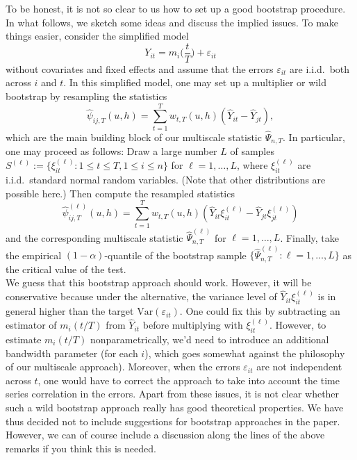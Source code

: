 \documentclass[a4paper,12pt]{article}
\begin{document}
\begin{enumerate}[label=\arabic*.,leftmargin=0.6cm]
To be honest, it is not so clear to us how to set up a good bootstrap procedure. In what follows, we sketch some ideas and discuss the implied issues. To make things easier, consider the simplified model 
\[ Y_{it} = m_i\Big(\frac{t}{T}\Big) + \varepsilon_{it} \]
without covariates and fixed effects and assume that the errors $\varepsilon_{it}$ are i.i.d.\ both across $i$ and $t$. In this simplified model, one may set up a multiplier or wild bootstrap by resampling the statistics
\[ \widehat{\psi}_{ij,T}(u,h) = \sum_{t=1}^T w_{t,T}(u,h) (\widehat{Y}_{it} - \widehat{Y}_{jt}), \]
which are the main building block of our multiscale statistic $\widehat{\Psi}_{n,T}$. In particular, one may proceed as follows: Draw a large number $L$ of samples $S^{(\ell)} := \{\xi_{it}^{(\ell)}: 1 \le t \le T, 1 \le i \le n \}$ for $\ell=1,\ldots,L$, where $\xi_{it}^{(\ell)}$ are i.i.d.\ standard normal random variables. (Note that other distributions are possible here.) Then compute the resampled statistics  
\[ \widehat{\psi}_{ij,T}^{(\ell)}(u,h) = \sum_{t=1}^T w_{t,T}(u,h) (\widehat{Y}_{it} \xi_{it}^{(\ell)} - \widehat{Y}_{jt} \xi_{jt}^{(\ell)}) \]
and the corresponding multiscale statistic $\widehat{\Psi}_{n,T}^{(\ell)}$ for $\ell=1,\ldots,L$. Finally, take the empirical $(1-\alpha)$-quantile of the bootstrap sample $\{ \widehat{\Psi}_{n,T}^{(\ell)}:  \ell=1,\ldots,L \}$ as the critical value of the test. \\
We guess that this bootstrap approach should work. However, it will be conservative because under the alternative, the variance level of $\widehat{Y}_{it} \xi_{it}^{(\ell)}$ is in general higher than the target $\text{Var}(\varepsilon_{it})$. One could fix this by subtracting an estimator of $m_i(t/T)$ from $\widehat{Y}_{it}$ before multiplying with $\xi_{it}^{(\ell)}$. However, to estimate $m_i(t/T)$ nonparametrically, we'd need to introduce an additional bandwidth parameter (for each $i$), which goes somewhat against the philosophy of our multiscale approach). Moreover, when the errors $\varepsilon_{it}$ are not independent across $t$, one would have to correct the approach to take into account the time series correlation in the errors. Apart from these issues, it is not clear whether such a wild bootstrap approach really has good theoretical properties. We have thus decided not to include suggestions for bootstrap approaches in the paper. However, we can of course include a discussion along the lines of the above remarks if you think this is needed.



\end{enumerate}
\end{document}

